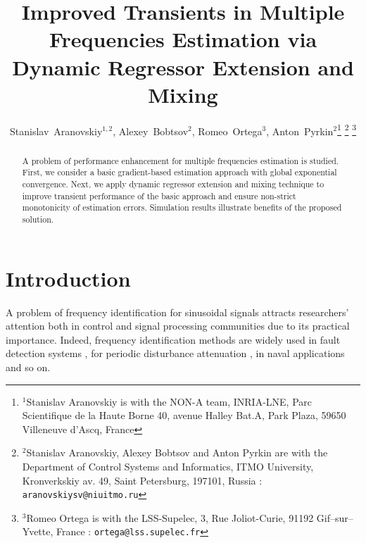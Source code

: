 \documentclass[journal, onecolumn]{IEEEtran}
\begin{document}
\title{Improved Transients in Multiple Frequencies Estimation via Dynamic Regressor Extension and Mixing} 
\author{Stanislav~Aranovskiy$^{1,2}$,
        Alexey~Bobtsov$^{2}$,
				Romeo~Ortega$^{3}$,
        Anton~Pyrkin$^{2}$\thanks{$^{1}$Stanislav Aranovskiy is with the NON-A team, INRIA-LNE, Parc Scientifique de la Haute Borne 40, avenue Halley Bat.A, Park Plaza, 59650 Villeneuve d'Ascq, France}		
\thanks{$^{2}$Stanislav Aranovskiy, Alexey Bobtsov and Anton Pyrkin are with the Department of Control Systems and Informatics, ITMO University, Kronverkskiy av. 49, Saint Petersburg, 197101, Russia :  {\tt\small aranovskiysv@niuitmo.ru}}
\thanks{$^{3}$Romeo Ortega is with the LSS-Supelec, 3, Rue Joliot-Curie, 91192 Gif--sur--Yvette, France : {\tt\small ortega@lss.supelec.fr}}
}

\maketitle 

\begin{abstract}                A problem of performance enhancement for multiple frequencies estimation is studied. First, we consider a basic gradient-based estimation approach with global exponential convergence. Next, we apply dynamic regressor extension and mixing technique to improve transient performance of the basic approach and ensure non-strict monotonicity of estimation errors. Simulation results illustrate benefits of the proposed solution.
\end{abstract}



\section{Introduction}
A problem of frequency identification for sinusoidal signals attracts researchers' attention both in control and signal processing communities due to its practical importance. Indeed, frequency identification methods are widely used in fault detection systems \cite{goupil2010oscillatory}, for periodic disturbance attenuation \cite{landau2011adaptive, bobtsov2011compensation}, in naval applications \cite{belleter2013globally} and so on.
\end{document}
